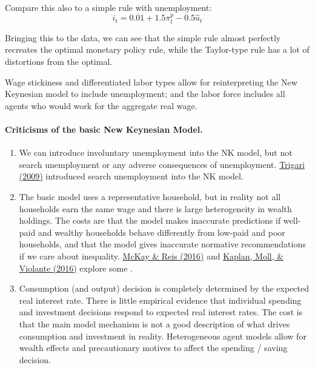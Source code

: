 \documentclass[10pt]{article}
\begin{document}
\begin{model}
	Compare this also to a simple rule with unemployment:\[i_t = 0.01 + 1.5 \pi_t^p - 0.5 \hat{u}_t\]
	
	Bringing this to the data, we can see that the simple rule almost perfectly recreates the optimal monetary policy rule, while the Taylor-type rule has a lot of distortions from the optimal.
\end{model}

\begin{remark}
	Wage stickiness and differentiated labor types allow for reinterpreting the New Keynesian model to include unemployment; and the labor force includes all agents who would work for the aggregate real wage. 
\end{remark}


\paragraph{Criticisms of the basic New Keynesian Model.} 
\begin{enumerate}
	\item We can introduce involuntary unemployment into the NK model, but not search unemployment or any adverse consequences of unemployment. \href{https://onlinelibrary.wiley.com/doi/full/10.1111/j.1538-4616.2008.00185.x}{Trigari (2009)} introduced search unemployment into the NK model.
	\item The basic model uses a representative household, but in reality not all households earn the same wage and there is large heterogeneity in wealth holdings. The costs are that the model makes inaccurate predictions if well-paid and wealthy households behave differently from low-paid and poor households, and that the model gives inaccurate normative recommendations if we care about inequality. \href{https://www.nber.org/system/files/working_papers/w19000/w19000.pdf}{McKay \& Reis (2016)} and \href{https://www.aeaweb.org/articles?id=10.1257/aer.20160042}{Kaplan, Moll, \& Violante (2016)} explore some .
	\item Consumption (and output) decision is completely determined by the expected real interest rate. There is little empirical evidence that individual spending and investment decisions respond to expected real interest rates. The cost is that the main model mechanism is not a good description of what drives consumption and investment in reality. Heterogeneous agent models allow for wealth effects and precautionary motives to affect the spending / saving decision.
\end{enumerate}
\end{document}
